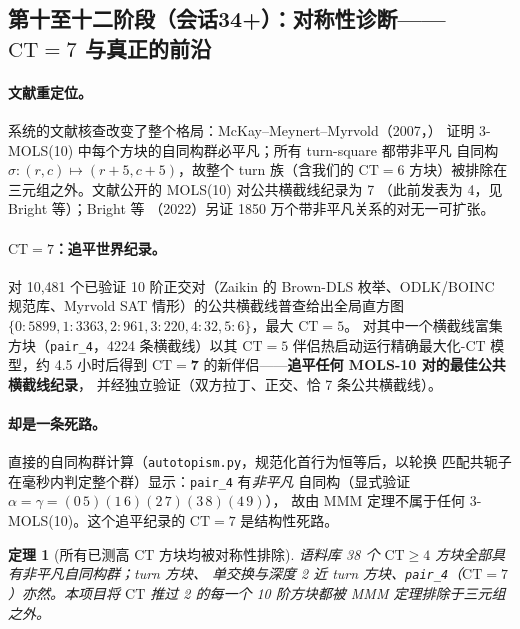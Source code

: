 \documentclass[11pt,a4paper]{ctexart}
\newtheorem{theorem}{定理}[section]
\theoremstyle{remark}
\newcommand{\CT}{\mathrm{CT}}
\begin{document}
\subsection{第十至十二阶段（会话34+）：对称性诊断——$\CT=7$ 与真正的前沿}
\label{sec:stage1012-zh}

\paragraph{文献重定位。}
系统的文献核查改变了整个格局：McKay--Meynert--Myrvold（2007，\cite{mmm2007}）
证明 3-MOLS(10) 中每个方块的自同构群必平凡；所有 turn-square 都带非平凡
自同构 $\sigma:(r,c)\mapsto(r{+}5,c{+}5)$，故整个 turn 族（含我们的 $\CT=6$
方块）被排除在三元组之外。文献公开的 MOLS(10) 对公共横截线纪录为 7
（此前发表为 4，见 Bright 等\cite{bright2022,bright2025}）；Bright 等
（2022）另证 1850 万个带非平凡关系的对无一可扩张。

\paragraph{$\CT=7$：追平世界纪录。}
对 10{,}481 个已验证 10 阶正交对（Zaikin 的 Brown-DLS 枚举、ODLK/BOINC
规范库、Myrvold SAT 情形）的公共横截线普查给出全局直方图
$\{0{:}5899,1{:}3363,2{:}961,3{:}220,4{:}32,5{:}6\}$，最大 $\CT=5$。
对其中一个横截线富集方块（\texttt{pair\_4}，4224 条横截线）以其 $\CT=5$
伴侣热启动运行精确最大化-$\CT$ 模型，约 4.5 小时后得到 $\CT=\mathbf{7}$
的新伴侣——\textbf{追平任何 MOLS-10 对的最佳公共横截线纪录}\cite{bright2022}，
并经独立验证（双方拉丁、正交、恰 7 条公共横截线）。

\paragraph{却是一条死路。}
直接的自同构群计算（\texttt{autotopism.py}，规范化首行为恒等后，以轮换
匹配共轭子在毫秒内判定整个群）显示：\texttt{pair\_4} 有\emph{非平凡}
自同构（显式验证 $\alpha=\gamma=(0\,5)(1\,6)(2\,7)(3\,8)(4\,9)$），
故由 MMM 定理\cite{mmm2007}不属于任何 3-MOLS(10)。这个追平纪录的 $\CT=7$
是结构性死路。

\begin{theorem}[所有已测高 $\CT$ 方块均被对称性排除]\label{thm:allexcluded-zh}
语料库 38 个 $\CT\geq4$ 方块\emph{全部}具有非平凡自同构群；turn 方块、
单交换与深度 2 近 turn 方块、\texttt{pair\_4}（$\CT=7$）亦然。本项目将
$\CT$ 推过 2 的每一个 10 阶方块都被 MMM 定理\cite{mmm2007}排除于三元组之外。
\end{theorem}
\end{document}
